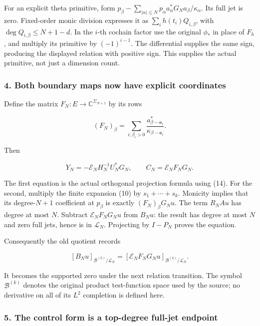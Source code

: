 For an explicit theta primitive, form
\(p_\beta-\sum_{|\alpha|\le N}p_\alpha a_\alpha^*G_Na_\beta/\kappa_\alpha\).
Its full jet is zero. Fixed-order monic division expresses it as
\(\sum_i h(t_i)Q_{i,\beta}\), with \(\deg Q_{i,\beta}\le N+1-d\). In the
\(i\)-th cochain factor use the original \(\phi_*\) in place of \(F_h\),
and multiply its primitive by \((-1)^{i-1}\). The differential supplies
the same sign, producing the displayed relation with positive sign. This
supplies the actual primitive, not just a dimension count.

\subsubsection{4. Both boundary maps now have explicit
coordinates}\label{kernel_layer:both-boundary-maps-now-have-explicit-coordinates}

Define the matrix \(F_N:E\to\mathbb C^{\Sigma_{N+1}}\) by its rows

\[
(F_N)_\beta=\sum_{i:\beta_i>0}
\frac{a_{\beta-\mathbf e_i}^*}{\kappa_{\beta-\mathbf e_i}}.
\tag{16}
\]

Then

\[
\boxed{Y_N=-\mathscr E_NH_N^{-1}U_N^*G_N,
\qquad C_N=\mathscr E_NF_NG_N.}
\tag{17}
\]

The first equation is the actual orthogonal projection formula using
(14). For the second, multiply the finite expansion (10) by
\(s_1+\cdots+s_k\). Monicity implies that its degree-\(N+1\) coefficient
at \(p_\beta\) is exactly \((F_N)_\beta G_Nu\). The term \(R_NAu\) has
degree at most \(N\). Subtract \(\mathscr E_NF_NG_Nu\) from \(B_Nu\):
the result has degree at most \(N\) and zero full jets, hence is in
\(\mathcal L_N\). Projecting by \(I-P_N\) proves the equation.

Consequently the old quotient records

\[
\boxed{[B_Nu]_{\mathscr B^{(k)}/\mathcal L_N}
=[\mathscr E_NF_NG_Nu]_{\mathscr B^{(k)}/\mathcal L_N}.}
\tag{18}
\]

It becomes the supported zero under the next relation transition. The
symbol \(\mathscr B^{(k)}\) denotes the original product test-function
space used by the source; no derivative on all of its \(L^2\) completion
is defined here.

\subsubsection{5. The control form is a top-degree full-jet
endpoint}\label{kernel_layer:the-control-form-is-a-top-degree-full-jet-endpoint}

